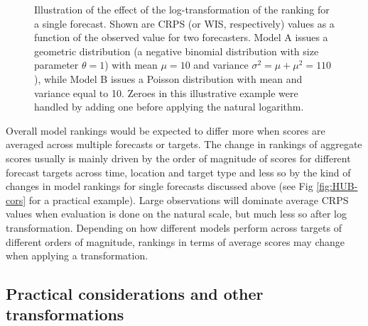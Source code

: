 \documentclass[10pt,letterpaper]{article}
\begin{document}
\begin{figure}[h!]
\centering
\caption{Illustration of the effect of the log-transformation of the ranking for a single forecast. Shown are CRPS (or WIS, respectively) values as a function of the observed value for two forecasters. Model A issues a geometric distribution (a negative binomial distribution with size parameter $\theta = 1$) with mean $\mu = 10$ and variance $\sigma^2 = \mu + \mu^2 = 110$), while Model B issues a Poisson distribution with mean and variance equal to 10. Zeroes in this illustrative example were handled by adding one before applying the natural logarithm.}
\label{fig:illustration-ranking}
\end{figure}

Overall model rankings would be expected to differ more when scores are averaged across multiple forecasts or targets. The change in rankings of aggregate scores usually is mainly driven by the order of magnitude of scores for different forecast targets across time, location and target type and less so by the kind of changes in model rankings for single forecasts discussed above (see Fig \ref{fig:HUB-cors} for a practical example). Large observations will dominate average CRPS values when evaluation is done on the natural scale, but much less so after log transformation. Depending on how different models perform across targets of different orders of magnitude, rankings in terms of average scores may change when applying a transformation.


\subsection*{Practical considerations and other transformations}
\label{sec:methods:considerations}
\end{document}
